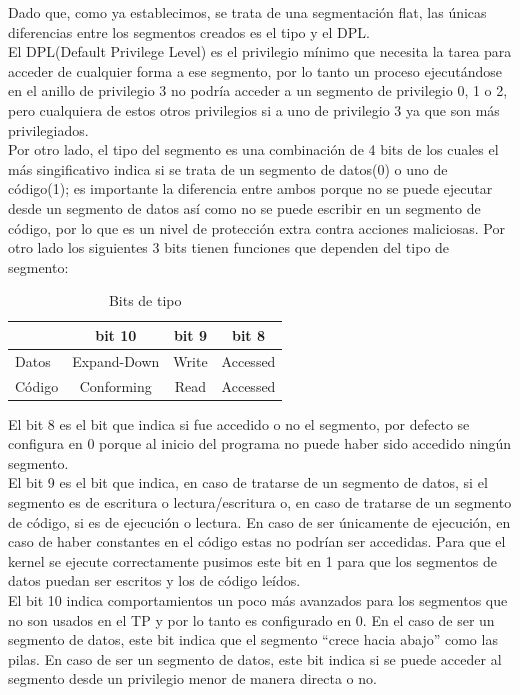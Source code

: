 \documentclass[10pt, a4paper]{article}
\begin{document}
Dado que, como ya establecimos, se trata de una segmentaci\'on flat, las \'unicas diferencias entre los segmentos creados es el tipo y el DPL.\\
El DPL(Default Privilege Level) es el privilegio m\'inimo que necesita la tarea para acceder de cualquier forma a ese segmento, por lo tanto un proceso ejecut\'andose en el anillo de privilegio 3 no podr\'ia acceder a un segmento de privilegio 0, 1 o 2, pero cualquiera de estos otros privilegios si a uno de privilegio 3 ya que son m\'as privilegiados.\\
Por otro lado, el tipo del segmento es una combinaci\'on de 4 bits de los cuales el m\'as singificativo indica si se trata de un segmento de datos(0) o uno de c\'odigo(1); es importante la diferencia entre ambos porque no se puede ejecutar desde un segmento de datos así como no se puede escribir en un segmento de c\'odigo, por lo que es un nivel de protecci\'on extra contra acciones maliciosas. Por otro lado los siguientes 3 bits tienen funciones que dependen del tipo de segmento:

\begin{table}
	\centering
	\begin{tabular}{l | c | c | c |}
		& bit 10 & bit 9 & bit 8 \\ \hline
		Datos & Expand-Down & Write & Accessed \\ \hline
		C\'odigo & Conforming & Read & Accessed \\ \hline
	\end{tabular}
	\caption{Bits de tipo}
\end{table}

El bit 8 es el bit que indica si fue accedido o no el segmento, por defecto se configura en 0 porque al inicio del programa no puede haber sido accedido ning\'un segmento.\\
El bit 9 es el bit que indica, en caso de tratarse de un segmento de datos, si el segmento es de escritura o lectura/escritura o, en caso de tratarse de un segmento de c\'odigo, si es de ejecuci\'on o lectura. En caso de ser \'unicamente de ejecuci\'on, en caso de haber constantes en el c\'odigo estas no podr\'ian ser accedidas. Para que el kernel se ejecute correctamente pusimos este bit en 1 para que los segmentos de datos puedan ser escritos y los de c\'odigo le\'idos.\\
El bit 10 indica comportamientos un poco m\'as avanzados para los segmentos que no son usados en el TP y por lo tanto es configurado en 0. En el caso de ser un segmento de datos, este bit indica que el segmento ``crece hacia abajo'' como las pilas. En caso de ser un segmento de datos, este bit indica si se puede acceder al segmento desde un privilegio menor de manera directa o no.\newline
\end{document}
